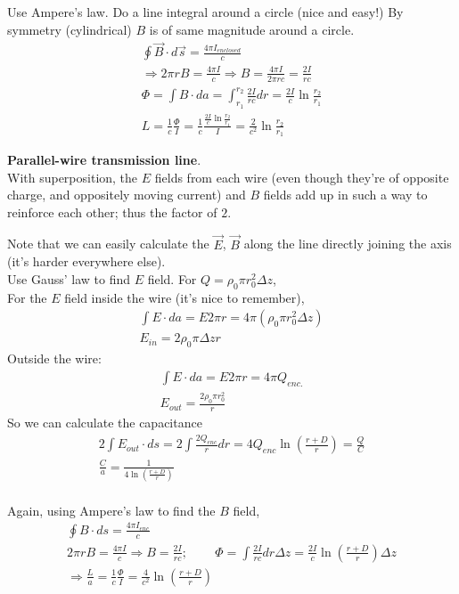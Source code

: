 \documentclass[twoside,10pt]{amsart}
\newcommand{\problemhead}[1]
  {\smallskip
   \noindent{\large\bf Problem #1.}
   \smallskip}
\begin{document}
Use Ampere's law.  Do a line integral around a circle (nice and easy!)  By symmetry (cylindrical) $B$ is of same magnitude around a circle.  
\[
\begin{gathered}
\oint \vec{B} \cdot d\vec{s} = \frac{4 \pi I_{enclosed} }{ c } \\
\Longrightarrow 2 \pi r B  = \frac{4 \pi I }{c } \Longrightarrow B = \frac{4 \pi I }{ 2 \pi r c} = \frac{2 I}{r c } \\
\Phi = \int B \cdot da = \int_{r_1}^{r_2} \frac{ 2 I }{rc} dr = \frac{ 2 I }{c} \ln{ \frac{r_2}{r_1} } \\
L = \frac{1}{c} \frac{ \Phi}{ I } = \frac{1}{c} \frac{  \frac{2 I }{c} \ln{ \frac{ r_2}{r_1} } }{ I } = \boxed{ \frac{2}{ c^2 } \ln{ \frac{r_2}{r_1} } }
\end{gathered}
\]

\problemhead{4.8} \textbf{ Parallel-wire transmission line}.  \\
With superposition, the $E$ fields from each wire (even though they're of opposite charge, and oppositely moving current) and $B$ fields add up in such a way to reinforce each other; thus the factor of $2$.  

Note that we can easily calculate the $\vec{E}$, $\vec{B}$ along the line directly joining the axis (it's harder everywhere else).  \bigskip \\
Use Gauss' law to find $E$ field.  For $Q = \rho_0 \pi r_0^2 \Delta z$, \medskip \\
\quad \quad For the $E$ field inside the wire (it's nice to remember), 
\[
\begin{gathered}
  \int E \cdot da = E 2\pi r = 4 \pi (\rho_0 \pi r_0^2 \Delta z) \\
  E_{in} = 2 \rho_0 \pi \Delta z r 
\end{gathered}
\]
Outside the wire:
\[
\begin{gathered}
  \int E \cdot da = E 2 \pi r = 4 \pi Q_{enc.} \\
  E_{out} = \frac{ 2 \rho_0 \pi r_0^2 }{ r } 
\end{gathered}
\]
So we can calculate the capacitance
\[
\begin{gathered}
  2 \int E_{out} \cdot ds = 2 \int \frac{ 2 Q_{enc}}{ r} dr = 4 Q_{enc} \ln{ \left( \frac{ r+D}{r} \right) } = \frac{Q}{C} \\
\boxed{  \frac{C}{a} = \frac{1}{4 \ln{ \left( \frac{r+D}{r} \right) } } }
\end{gathered}
\]
\quad \\
Again, using Ampere's law to find the $B$ field,
\[
\begin{gathered}
  \oint B \cdot ds = \frac{ 4 \pi I_{enc}}{ c } \\
  2 \pi r B = \frac{ 4 \pi I }{c}  \Longrightarrow B = \frac{2 I}{rc}; \quad \quad \, \Phi = \int \frac{2 I }{rc} dr \Delta z = \frac{2 I}{c} \ln{ \left( \frac{r+D}{r} \right) } \Delta z \\
  \Longrightarrow \boxed{ \frac{L}{a} = \frac{1}{c} \frac{ \Phi}{ I } = \frac{4 }{c^2 } \ln{ \left( \frac{r+D}{r} \right) } }
\end{gathered}
\]
\end{document}
